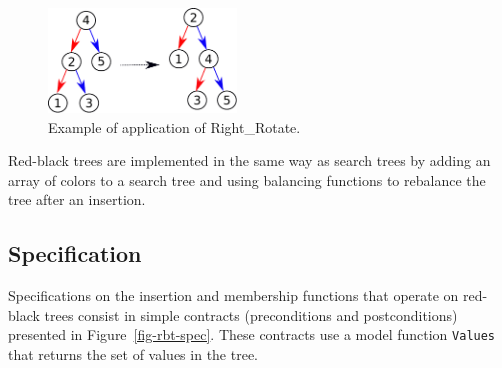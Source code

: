 \documentclass{llncs}
\begin{document}


\begin{figure}[ht]
\begin{center}
\includegraphics[width=5cm]{rotate_right.pdf}
\caption{\label{fig-search-rot} Example of application of Right\_Rotate.}
\end{center}
\end{figure}

Red-black trees are implemented in the same way as search trees by adding an
array of colors to a search tree and using balancing functions to rebalance the
tree after an insertion.

\subsection{Specification}

Specifications on the insertion and membership functions that operate on
red-black trees consist in simple contracts (preconditions and postconditions)
presented in Figure~\ref{fig-rbt-spec}. These contracts use a model function
\texttt{Values} that returns the set of values in the tree.

\end{document}
